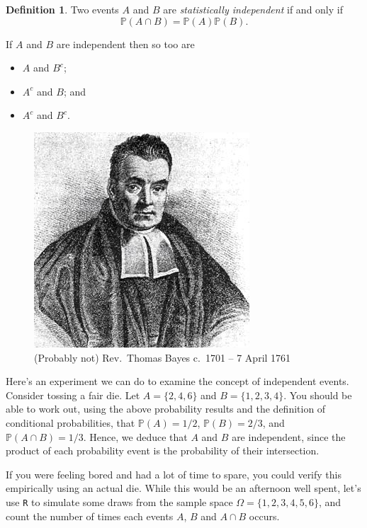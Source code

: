 \documentclass[
]{book}
\providecommand{\tightlist}{%
  \setlength{\itemsep}{0pt}\setlength{\parskip}{0pt}}
\newcommand{\bbP}{\mathbb{P}}
\theoremstyle{definition}
\newtheorem{definition}{Definition}[chapter]
\theoremstyle{definition}
\theoremstyle{definition}
\theoremstyle{definition}
\theoremstyle{remark}
\begin{document}
\begin{definition}
Two events \(A\) and \(B\) are \emph{statistically independent} if and only if
\[
  \bbP(A \cap B) = \bbP(A)\bbP(B).
\]
\end{definition}

If \(A\) and \(B\) are independent then so too are

\begin{itemize}
\tightlist
\item
  \(A\) and \(B^c\);
\item
  \(A^c\) and \(B\); and
\item
  \(A^c\) and \(B^c\).
\end{itemize}

\begin{figure}
\centering
\includegraphics{figure/bayes.jpg}
\caption{(Probably not) Rev.~Thomas Bayes c.~1701 -- 7 April 1761}
\end{figure}

Here's an experiment we can do to examine the concept of independent events.
Consider tossing a fair die.
Let \(A = \{2, 4, 6\}\) and \(B = \{1,2,3,4\}\).
You should be able to work out, using the above probability results and the definition of conditional probabilities, that \(\bbP(A)=1/2\), \(\bbP(B)=2/3\), and \(\bbP(A \cap B)=1/3\).
Hence, we deduce that \(A\) and \(B\) are independent, since the product of each probability event is the probability of their intersection.

If you were feeling bored and had a lot of time to spare, you could verify this empirically using an actual die.
While this would be an afternoon well spent, let's use \texttt{R} to simulate some draws from the sample space \(\Omega = \{1,2,3,4,5,6\}\), and count the number of times each events \(A\), \(B\) and \(A \cap B\) occurs.
\end{document}
